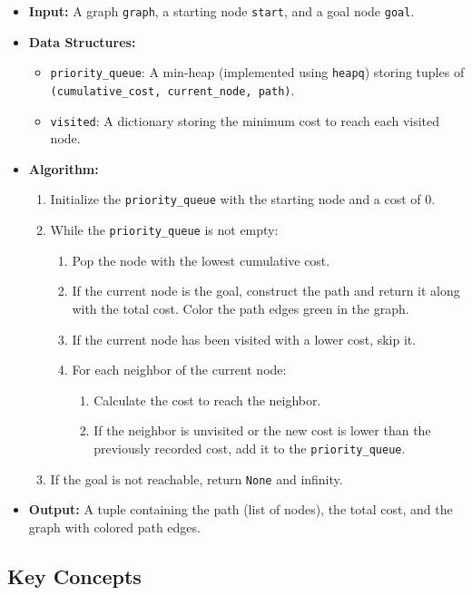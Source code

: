 \documentclass[final, journal, 11pt]{article}
\begin{document}
	\begin{itemize}
		\item \textbf{Input:} A graph \texttt{graph}, a starting node \texttt{start}, and a goal node \texttt{goal}.
		\item \textbf{Data Structures:}
		\begin{itemize}
			\item \texttt{priority\_queue}: A min-heap (implemented using \texttt{heapq}) storing tuples of \texttt{(cumulative\_cost, current\_node, path)}.
			\item \texttt{visited}: A dictionary storing the minimum cost to reach each visited node.
		\end{itemize}
		\item \textbf{Algorithm:}
		\begin{enumerate}
			\item Initialize the \texttt{priority\_queue} with the starting node and a cost of 0.
			\item While the \texttt{priority\_queue} is not empty:
			\begin{enumerate}
				\item Pop the node with the lowest cumulative cost.
				\item If the current node is the goal, construct the path and return it along with the total cost. Color the path edges green in the graph.
				\item If the current node has been visited with a lower cost, skip it.
				\item For each neighbor of the current node:
				\begin{enumerate}
					\item Calculate the cost to reach the neighbor.
					\item If the neighbor is unvisited or the new cost is lower than the previously recorded cost, add it to the \texttt{priority\_queue}.
				\end{enumerate}
			\end{enumerate}
			\item If the goal is not reachable, return \texttt{None} and infinity.
		\end{enumerate}
		\item \textbf{Output:} A tuple containing the path (list of nodes), the total cost, and the graph with colored path edges.
	\end{itemize}
	
	\subsection{Key Concepts}
	
\end{document}
